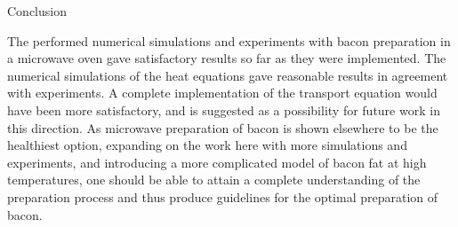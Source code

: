 \documentclass[final,hyperref={pdfpagelabels=false}]{beamer}
\begin{document}
\begin{frame}
\begin{columns}[t]
\begin{column}{1\textwidth}
\begin{multicols}{2}
\vspace{1.0\baselineskip}
{\Large Conclusion}
	    
The performed numerical simulations and experiments with bacon preparation
in a microwave oven gave satisfactory results so far as they were implemented.
The numerical simulations of the heat equations gave reasonable results in agreement
with experiments. A complete implementation of the transport equation would have been
more satisfactory, and is suggested as a possibility for future work in this
direction. As microwave preparation of bacon is shown elsewhere to be the
healthiest option, expanding on the work here with more simulations and
experiments, and introducing a more complicated model of bacon fat at high
temperatures, one should be able to attain a complete understanding of the
preparation process and thus produce guidelines for the optimal preparation of
bacon.

    \end{multicols}



  \end{column}
  \end{columns}
  \end{frame}
\end{document}
